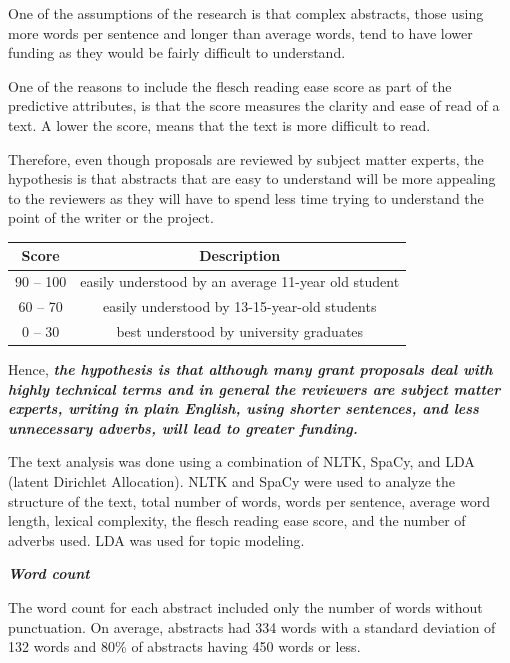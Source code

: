 \documentclass[11pt, oneside]{article}   	%
\begin{document}
One of the assumptions of the research is that complex abstracts, those using more words per sentence and longer than average words, tend to have lower funding as they would be fairly difficult to understand. 

One of the reasons to include the flesch reading ease score as part of the predictive attributes, is that the score measures the clarity and ease of read of a text. A lower the score, means that the text is more difficult to read.

Therefore, even though proposals are reviewed by subject matter experts, the hypothesis is that abstracts that are easy to understand will be more appealing to the reviewers as they will have to spend less time trying to understand the point of the writer or the project.

\begin{center}
 \begin{tabular}{|c | c|} 
 \hline
 Score & Description\\
 \hline\hline    
90 – 100  & easily understood by an average 11-year old student \\
60 – 70 & easily understood by 13-15-year-old students\\
0 – 30& best understood by university graduates\\
 \hline
\end{tabular}
\end{center}

\vspace{5mm}

Hence,  \textbf{\emph{the hypothesis is that although many grant proposals deal with highly technical terms and in general the reviewers are subject matter experts, writing in plain English, using shorter sentences, and less unnecessary adverbs,  will lead to greater funding.}}

\vspace{5mm}
The text analysis was done using a combination of NLTK, SpaCy, and LDA (latent Dirichlet Allocation). NLTK and SpaCy were used to analyze the structure of the text, total number of words, words per sentence, average word length, lexical complexity, the flesch reading ease score, and the number of adverbs used. LDA was used for topic modeling.

 \textbf{\emph{Word count } }
 
The word count for each abstract included only the number of words without punctuation. On average, abstracts had 334 words with a standard deviation of 132 words and 80\% of abstracts having 450 words or less. 
\end{document}
